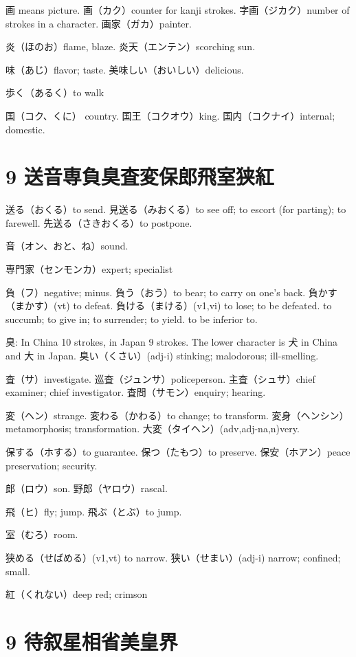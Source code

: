 画 means picture.
画（カク）counter for kanji strokes.
字画（ジカク）number of strokes in a character.
画家（ガカ）painter.

炎（ほのお）flame, blaze.
炎天（エンテン）scorching sun.

味（あじ）flavor; taste.
美味しい（おいしい）delicious.

歩く（あるく）to walk

国（コク、くに） country.
国王（コクオウ）king.
国内（コクナイ）internal; domestic.

\section{9 送音専負臭査変保郎飛室狭紅}

送る（おくる）to send.
見送る（みおくる）to see off; to escort (for parting); to farewell.
先送る（さきおくる）to postpone.

音（オン、おと、ね）sound.

専門家（センモンカ）expert; specialist

負（フ）negative; minus.
負う（おう）to bear; to carry on one's back.
負かす（まかす）(vt) to defeat.
負ける（まける）(v1,vi)
to lose; to be defeated.
to succumb; to give in; to surrender; to yield.
to be inferior to.

臭: In China 10 strokes, in Japan 9 strokes.
The lower character is 犬 in China and 大 in Japan.
臭い（くさい）(adj-i) stinking; malodorous; ill-smelling.

査（サ）investigate.
巡査（ジュンサ）policeperson.
主査（シュサ）chief examiner; chief investigator.
査問（サモン）enquiry; hearing.

変（ヘン）strange.
変わる（かわる）to change; to transform.
変身（ヘンシン）metamorphosis; transformation.
大変（タイヘン）(adv,adj-na,n)very.

保する（ホする）to guarantee.
保つ（たもつ）to preserve.
保安（ホアン）peace preservation; security.

郎（ロウ）son.
野郎（ヤロウ）rascal.

飛（ヒ）fly; jump.
飛ぶ（とぶ）to jump.

室（むろ）room.

狭める（せばめる）(v1,vt) to narrow.
狭い（せまい）(adj-i) narrow; confined; small.

紅（くれない）deep red; crimson

\section{9 待叙星相省美皇界}

